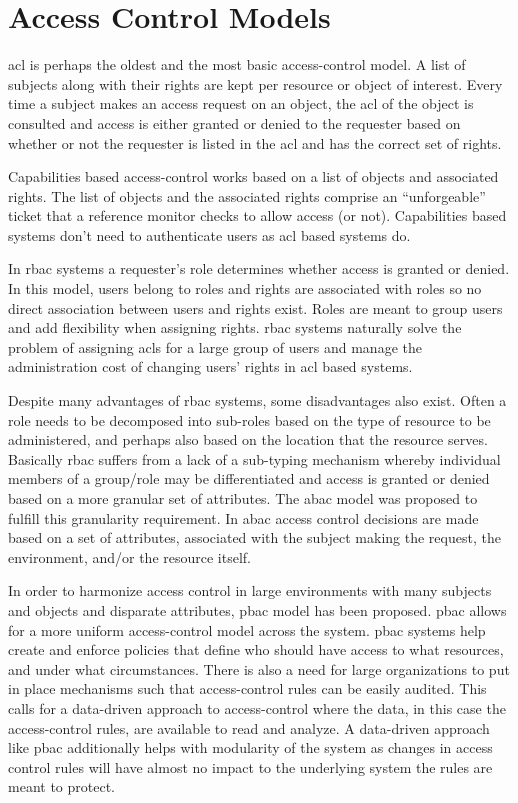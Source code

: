 \documentclass[runningheads,a4paper]{llncs}
\begin{document}
\section{Access Control Models}\label{sec:models}


\ac{acl} is perhaps the oldest and the most basic access-control model. A list of subjects along with their rights are kept per resource or object of interest. Every time a subject makes an access request on an object, the \ac{acl} of the object is consulted and access is either granted or denied to the requester based on whether or not the requester is listed in the \ac{acl} and has the correct set of rights.

Capabilities based access-control works based on a list of objects and associated rights. The list of objects and the associated rights comprise an ``unforgeable'' ticket that a reference monitor checks to allow access (or not). Capabilities based systems don't need to authenticate users as \ac{acl} based systems do.

In \ac{rbac} systems a requester's role determines whether access is granted or denied. In this model, users belong to roles and rights are associated with roles so no direct association between users and rights exist. Roles are meant to group users and add flexibility when assigning rights. \ac{rbac} systems naturally solve the problem of assigning \ac{acl}s for a large group of users and manage the administration cost of changing users' rights in \ac{acl} based systems.


Despite many advantages of \ac{rbac} systems, some disadvantages also exist. Often a role needs to be decomposed into sub-roles based on the type of resource to be administered, and perhaps also based on the location that the resource serves. Basically \ac{rbac} suffers from a lack of a sub-typing mechanism whereby individual members of a group/role may be differentiated and access is granted or denied based on a more granular set of attributes. The \ac{abac} model was proposed to fulfill this granularity requirement. In \ac{abac} access control decisions are made based on a set of attributes, associated with the subject making the request, the environment, and/or the resource itself. 

In order to harmonize access control in large environments with many subjects and objects and disparate attributes, \ac{pbac} model has been proposed. \ac{pbac} allows for a more uniform access-control model across the system. \ac{pbac} systems help create and enforce policies
that define who should have access to what resources, and under what circumstances.
There is also a need for large organizations to put in place mechanisms such that access-control rules can be easily audited. This calls for a data-driven approach to access-control where the data, in this case the access-control rules, are available to read and analyze. A data-driven approach like \ac{pbac} additionally helps with modularity of the system as changes in access control rules will have almost no impact to the underlying system the rules are meant to protect.
\end{document}
